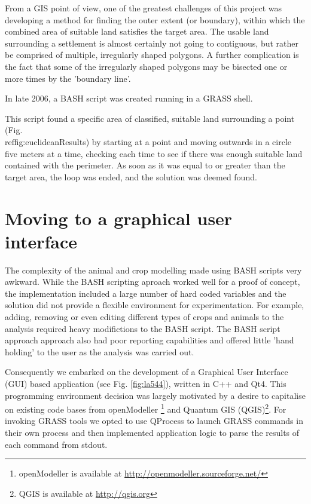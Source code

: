 From a GIS point of view, one of the greatest challenges of this project was
developing a method for finding the outer extent (or boundary), within which
the combined area of suitable land satisfies the target area.  The usable land
surrounding a settlement is almost certainly not going to contiguous, but
rather be comprised of multiple, irregularly shaped polygons. A further
complication is the fact that some of the irregularly shaped polygons may
be bisected one or more times by the 'boundary line'.  

In late 2006, a BASH script was created running in a GRASS shell.

This script found a specific area of classified, suitable land surrounding a
point (Fig.\\ref{fig:euclideanResults})  by starting at a point and moving
outwards in a circle five meters at a time, checking each time to see if there
was enough suitable land contained with the perimeter.  As soon as it was equal
to or greater than the target area, the loop was ended, and the solution was
deemed found.

\section{Moving to a graphical user interface} \label{GUI} 
 
The complexity of the animal and crop modelling made using BASH scripts very
awkward.  While the BASH scripting aproach worked well for a proof of concept,
the implementation included a large number of hard coded variables and the solution 
did not provide a flexible environment for experimentation. For example, adding, removing or even 
editing different types of crops and animals to the analysis required heavy modifictions 
to the BASH script.  The BASH script approach approach also had poor reporting
capabilities and offered little 'hand holding' to the user as the analysis was 
carried out.

Consequently we embarked on the development of a Graphical User Interface (GUI) based 
application (see Fig. \ref{fig:la544}), written in C++ and Qt4. This programming environment decision was largely 
motivated by a desire to capitalise on existing code bases from openModeller
\footnote{openModeller is available at \url{http://openmodeller.sourceforge.net/}} 
and Quantum GIS (QGIS)\footnote{QGIS is available at \url{http://qgis.org}}.  
For invoking GRASS tools we opted to use QProcess to launch GRASS commands in 
their own process and then implemented application logic to parse the results of 
each command from stdout.

